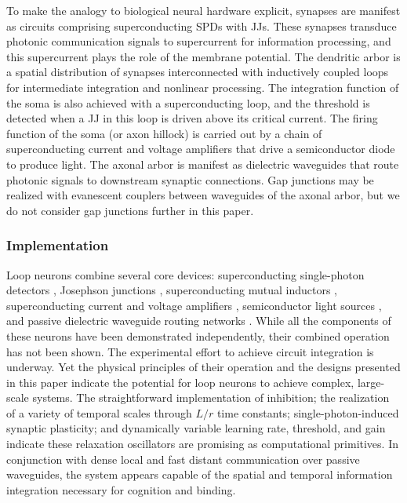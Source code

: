 \documentclass[twocolumn]{article}
\begin{document}
To make the analogy to biological neural hardware explicit, synapses are manifest as circuits comprising superconducting SPDs with JJs. These synapses transduce photonic communication signals to supercurrent for information processing, and this supercurrent plays the role of the membrane potential. The dendritic arbor is a spatial distribution of synapses interconnected with inductively coupled loops for intermediate integration and nonlinear processing. The integration function of the soma is also achieved with a superconducting loop, and the threshold is detected when a JJ in this loop is driven above its critical current. The firing function of the soma (or axon hillock) is carried out by a chain of superconducting current and voltage amplifiers that drive a semiconductor diode to produce light. The axonal arbor is manifest as dielectric waveguides that route photonic signals to downstream synaptic connections. Gap junctions may be realized with evanescent couplers between waveguides of the axonal arbor, but we do not consider gap junctions further in this paper.

\subsubsection{\label{sec:implementation}Implementation}
Loop neurons combine several core devices: superconducting single-photon detectors \cite{gook2001,nata2012,liyo2013,mave2013}, Josephson junctions \cite{ti1996,vatu1998,ka1999}, superconducting mutual inductors \cite{miha2005}, superconducting current \cite{mcbe2014,mcab2016} and voltage amplifiers \cite{zhto2018}, semiconductor light sources \cite{shbu2017,buch2017}, and passive dielectric waveguide routing networks \cite{chbu2017,sami2017,chbu2018}. While all the components of these neurons have been demonstrated independently, their combined operation has not been shown. The experimental effort to achieve circuit integration is underway. Yet the physical principles of their operation and the designs presented in this paper indicate the potential for loop neurons to achieve complex, large-scale systems. The straightforward implementation of inhibition; the realization of a variety of temporal scales through $L/r$ time constants; single-photon-induced synaptic plasticity; and dynamically variable learning rate, threshold, and gain indicate these relaxation oscillators are promising as computational primitives. In conjunction with dense local and fast distant communication over passive waveguides, the system appears capable of the spatial and temporal information integration necessary for cognition and binding. 
	
\end{document}
